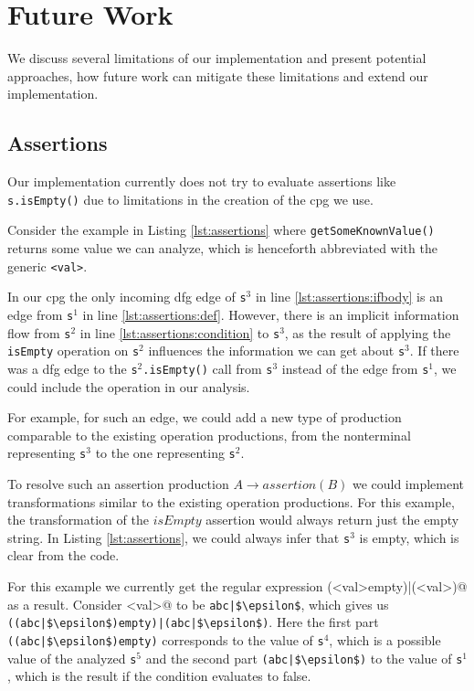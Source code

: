 \section{Future Work}

We discuss several limitations of our implementation and present potential approaches, how future work can mitigate these limitations and extend our implementation.

\subsection{Assertions}

Our implementation currently does not try to evaluate assertions like \lstinline|s.isEmpty()| due to limitations in the creation of the \ac{cpg} we use.

Consider the example in Listing \ref{lst:assertions} where \lstinline|getSomeKnownValue()| returns some value we can analyze, which is henceforth abbreviated with the generic \lstinline|<val>|.

In our \ac{cpg} the only incoming \ac{dfg} edge of \lstinline|s|$^3$ in line \ref{lst:assertions:ifbody} is an edge from \lstinline|s|$^1$ in line \ref{lst:assertions:def}. However, there is an implicit information flow from \lstinline|s|$^2$ in line \ref{lst:assertions:condition} to \lstinline|s|$^3$, as the result of applying the \lstinline|isEmpty| operation on \lstinline|s|$^2$ influences the information we can get about \lstinline|s|$^3$. If there was a \ac{dfg} edge to the \lstinline|s|$^2$\lstinline|.isEmpty()| call from \lstinline|s|$^3$ instead of the edge from \lstinline|s|$^1$, we could include the operation in our analysis.

For example, for such an edge, we could add a new type of production comparable to the existing operation productions, from the nonterminal representing \lstinline|s|$^3$ to the one representing \lstinline|s|$^2$.

To resolve such an assertion production $A \rightarrow assertion(B)$ we could implement transformations similar to the existing operation productions. For this example, the transformation of the $isEmpty$ assertion would always return just the empty string.
In Listing \ref{lst:assertions}, we could always infer that \lstinline|s|$^3$ is empty, which is clear from the code.

For this example we currently get the regular expression \Verb@(<val>empty)|(<val>)@ as a result. 
Consider \Verb@<val>@ to be \lstinline[mathescape]@abc|$\epsilon$@, which gives us \lstinline[mathescape]@((abc|$\epsilon$)empty)|(abc|$\epsilon$)@.
Here the first part \lstinline[mathescape]@((abc|$\epsilon$)empty)@ corresponds to the value of \lstinline|s|$^4$, which is a possible value of the analyzed \lstinline|s|$^5$ and the second part \lstinline[mathescape]@(abc|$\epsilon$)@ to the value of \lstinline|s|$^1$, which is the result if the condition evaluates to false.

